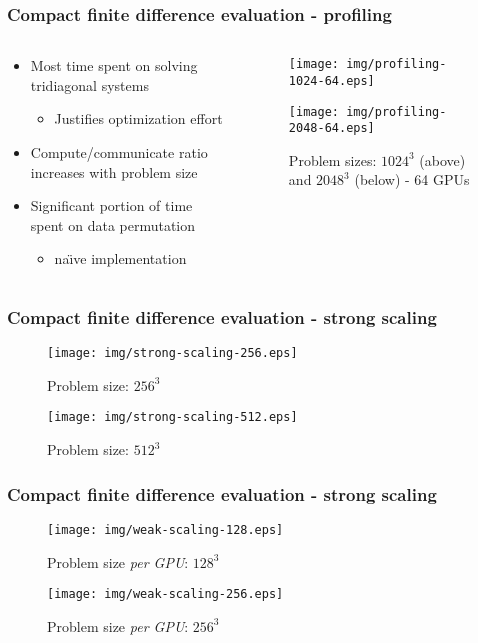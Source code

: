 \begin{frame}
\frametitle{Compact finite difference evaluation - profiling}
\begin{columns}
\begin{column}{0.5\textwidth}
\begin{itemize}
\item Most time spent on solving tridiagonal systems
    \begin{itemize}
        \item Justifies optimization effort
    \end{itemize}
\item Compute/communicate ratio increases with
    problem size
\item Significant portion of time spent on
    data permutation
    \begin{itemize}
        \item na\"{\i}ve implementation
    \end{itemize}
\end{itemize}
\end{column}
\begin{column}{0.5\textwidth}
\centering
\begin{figure}
\centering
\texttt{[image: img/profiling-1024-64.eps]}

\texttt{[image: img/profiling-2048-64.eps]}
\caption{Problem sizes: $1024^3$ (above)
    and $2048^3$ (below) - 64 GPUs}
\end{figure}
\end{column}
\end{columns}
\end{frame}

\begin{frame}
\frametitle{Compact finite difference evaluation - strong scaling}
\begin{figure}
\begin{minipage}{.45\textwidth}
\centering
\texttt{[image: img/strong-scaling-256.eps]}
\caption{Problem size: $256^3$}
\end{minipage}
\begin{minipage}{.45\textwidth}
\centering
\texttt{[image: img/strong-scaling-512.eps]}
\caption{Problem size: $512^3$}
\end{minipage}
\end{figure}
\centering
\end{frame}

\begin{frame}
\frametitle{Compact finite difference evaluation - strong scaling}
\begin{figure}
\begin{minipage}{.45\textwidth}
\centering
\texttt{[image: img/weak-scaling-128.eps]}
\caption{Problem size \emph{per GPU}: $128^3$}
\end{minipage}
\begin{minipage}{.45\textwidth}
\centering
\texttt{[image: img/weak-scaling-256.eps]}
\caption{Problem size \emph{per GPU}: $256^3$}
\end{minipage}
\end{figure}
\centering
\end{frame}

